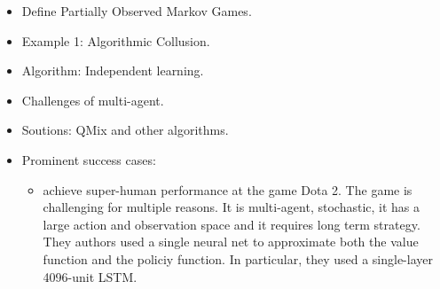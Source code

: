 \documentclass[11pt,english]{article}
\begin{document}
\begin{itemize}
\item Define Partially Observed Markov Games.
\item Example 1: Algorithmic Collusion.
\item Algorithm: Independent learning.
\item Challenges of multi-agent.
\item Soutions: QMix and other algorithms. 
\item Prominent success cases:
\begin{itemize}
	
\item \citet{berner2019} achieve super-human performance at the game Dota 2. The game is challenging for multiple reasons. It is multi-agent, stochastic, it has a large action and observation space and it requires long term strategy. They authors used a single neural net to approximate both the value function and the policiy function. In particular, they used a single-layer 4096-unit LSTM.


\end{itemize}
\end{itemize}
\end{document}
